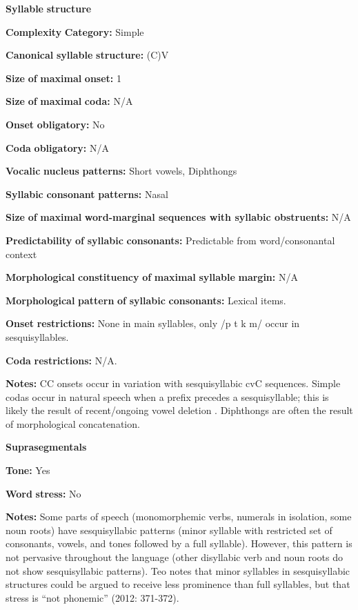 \begin{styleBody}
\textbf{Syllable} \textbf{structure}

\textbf{Complexity} \textbf{Category:} Simple

\textbf{Canonical} \textbf{syllable} \textbf{structure:} (C)V \citep[57-64]{Teo2009}

\textbf{Size} \textbf{of} \textbf{maximal} \textbf{onset:} 1

\textbf{Size} \textbf{of} \textbf{maximal} \textbf{coda:} N/A

\textbf{Onset} \textbf{obligatory:} No

\textbf{Coda} \textbf{obligatory:} N/A

\textbf{Vocalic} \textbf{nucleus} \textbf{patterns:} Short vowels, Diphthongs

\textbf{Syllabic} \textbf{consonant} \textbf{patterns:} Nasal

\textbf{Size} \textbf{of} \textbf{maximal} \textbf{word{}-marginal sequences with syllabic obstruents:} N/A

\textbf{Predictability} \textbf{of} \textbf{syllabic} \textbf{consonants:} Predictable from word/consonantal context

\textbf{Morphological} \textbf{constituency} \textbf{of} \textbf{maximal} \textbf{syllable} \textbf{margin:} N/A

\textbf{Morphological} \textbf{pattern} \textbf{of} \textbf{syllabic} \textbf{consonants:} Lexical items.

\textbf{Onset} \textbf{restrictions:} None in main syllables, only /p t k m/ occur in sesquisyllables.

\textbf{Coda} \textbf{restrictions:} N/A.

\textbf{Notes:} CC onsets occur in variation with sesquisyllabic cvC sequences. Simple codas occur in natural speech when a prefix precedes a sesquisyllable; this is likely the result of recent/ongoing vowel deletion \citep[62-4]{Teo2009}. Diphthongs are often the result of morphological concatenation.

\textbf{Suprasegmentals}

\textbf{Tone:} Yes

\textbf{Word} \textbf{stress:} No

\textbf{Notes:} Some parts of speech (monomorphemic verbs, numerals in isolation, some noun roots) have sesquisyllabic patterns  (minor syllable with restricted set of consonants, vowels, and tones followed by a full syllable). However, this pattern is not pervasive throughout the language (other disyllabic verb and noun roots do not show sesquisyllabic patterns). Teo notes that minor syllables in sesquisyllabic structures could be argued to receive less prominence than full syllables, but that stress is “not phonemic” (2012: 371-372).


\end{styleBody}

